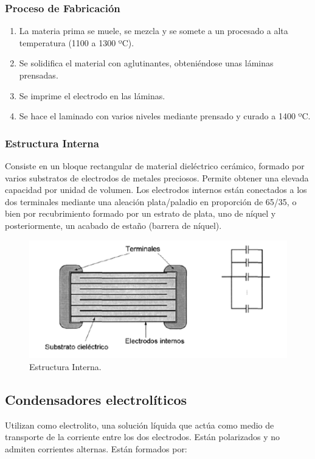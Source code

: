 \subsubsection{Proceso de Fabricación}

\begin{enumerate}
    \item La materia prima se muele, se mezcla y se somete a un procesado a alta temperatura (1100 a 1300 ºC).
    \item Se solidifica el material con aglutinantes, obteniéndose unas láminas prensadas.
    \item Se imprime el electrodo en las láminas.
    \item Se hace el laminado con varios niveles mediante prensado y curado a 1400 ºC.
\end{enumerate}

\subsubsection{Estructura Interna}

Consiste en un bloque rectangular de material dieléctrico cerámico, formado por varios substratos de electrodos de metales preciosos. Permite obtener una elevada capacidad por unidad de volumen. Los electrodos internos están conectados a los dos terminales mediante una aleación plata/paladio en proporción de 65/35, o bien por recubrimiento formado por un estrato de plata, uno de níquel y posteriormente, un acabado de estaño (barrera de níquel).

\begin{figure}[H]
    \centering
    \includegraphics[width=0.5\linewidth]{Imagenes/Condensadores Ceramicos - Estructura Interna.png}
    \caption{Estructura Interna.}
\end{figure}

\subsection{Condensadores electrolíticos}

Utilizan como electrolito, una solución líquida que actúa como medio de transporte de la corriente entre los dos electrodos. Están polarizados y no admiten corrientes alternas. Están formados por:

